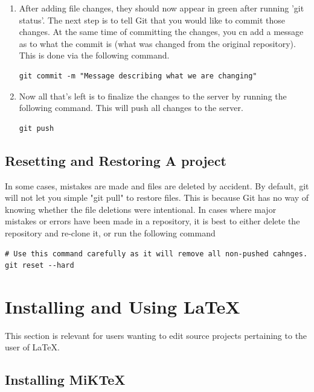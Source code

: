 \begin{enumerate}
	\item After adding file changes, they should now appear in green after running 'git status'. The next step is to tell Git that you would like to commit those changes. At the same time of committing the changes, you cn add a message as to what the commit is (what was changed from the original repository). This is done via the following command.
	
\begin{lstlisting}
git commit -m "Message describing what we are changing"
\end{lstlisting}

	\item Now all that's left is to finalize the changes to the server by running the following command. This will push all changes to the server.
	
\begin{lstlisting}
git push
\end{lstlisting}
	
\end{enumerate}


\section{Resetting and Restoring A project}

In some cases, mistakes are made and files are deleted by accident. By default, git will not let you simple "git pull" to restore files. This is because Git has no way of knowing whether the file deletions were intentional. In cases where major mistakes or errors have been made in a repository, it is best to either delete the repository and re-clone it, or run the following command

\begin{lstlisting}
# Use this command carefully as it will remove all non-pushed cahnges.
git reset --hard
\end{lstlisting}



\chapter{Installing and Using LaTeX}

This section is relevant for users wanting to edit source projects pertaining to the user of \LaTeX. 

\section{Installing MiKTeX}

